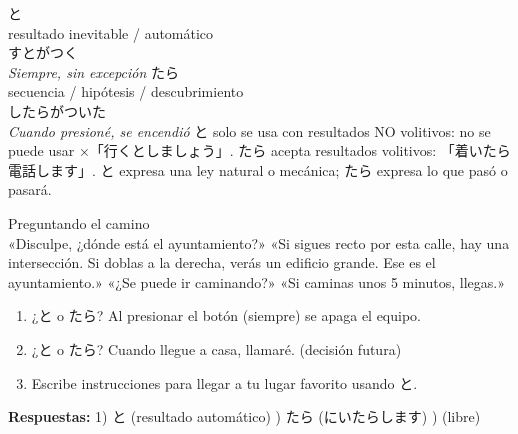   {と\\\small resultado inevitable / automático\\\small {}すとがつく\\\textit{Siempre, sin excepción}}
  {たら\\\small secuencia / hipótesis / descubrimiento\\\small {}したらがついた\\\textit{Cuando presioné, se encendió}}
  {と solo se usa con resultados NO volitivos: no se puede usar ×「行くとしましょう」. たら acepta resultados volitivos: 「着いたら電話します」. と expresa una ley natural o mecánica; たら expresa lo que pasó o pasará.}



{Preguntando el camino\\[0.4em]
  «Disculpe, ¿dónde está el ayuntamiento?» «Si sigues recto por esta calle, hay una intersección. Si doblas a la derecha, verás un edificio grande. Ese es el ayuntamiento.» «¿Se puede ir caminando?» «Si caminas unos 5 minutos, llegas.»}

\begin{tcolorbox}[ejerciciobox, title={\emoji{pencil} Ejercicios}]
\begin{enumerate}
  \item ¿と o たら? Al presionar el botón (siempre) se apaga el equipo.
  \item ¿と o たら? Cuando llegue a casa, llamaré. (decisión futura)
  \item Escribe instrucciones para llegar a tu lugar favorito usando と.
\end{enumerate}
\textbf{Respuestas:}
1) と (resultado automático) ) たら (にいたらします) ) (libre)
\end{tcolorbox}

